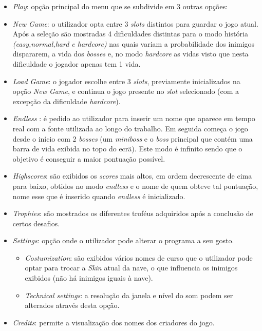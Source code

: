 \documentclass[a4paper,11pt]{article}
\begin{document}
\begin{itemize}
    \item \textit{Play}: opção principal do menu que se subdivide em 3 outras opções:
    \item \textit{New Game}: o utilizador opta entre 3 \textit{slots} distintos para guardar o jogo atual. Após a seleção são mostradas 4 dificuldades distintas para o modo história\textit{ (easy,normal,hard e hardcore)} nas quais variam a probabilidade dos inimigos dispararem, a vida dos \textit{bosses} e, no modo \textit{hardcore} as vidas visto que nesta dificuldade o jogador apenas tem 1 vida.

    \item \textit{Load Game}: o jogador escolhe entre 3 \textit{slots}, previamente inicializados na opção \textit{New Game}, e continua o jogo presente no \textit{slot} selecionado (com a excepção da dificuldade \textit{hardcore}).

    \item   \textit{Endless} : é pedido ao utilizador para inserir um nome que aparece em tempo real com a fonte utilizada ao longo do trabalho. Em seguida começa o jogo desde o início com 2 \textit{bosses} (um \textit{miniboss} e o \textit{boss} principal que contém uma barra de vida exibida no topo do ecrã). Este modo é infinito sendo que o objetivo é conseguir a maior pontuação possível.
    \item  \textit{Highscores}: são exibidos os \textit{scores }mais altos, em ordem decrescente de cima para baixo, obtidos no modo \textit{endless} e o nome de quem obteve tal pontuação, nome esse que é inserido quando \textit{endless} é inicializado.

    \item \textit{Trophies}: são mostrados os diferentes troféus adquiridos após a conclusão de certos desafios.
    \item \textit{Settings}: opção onde o utilizador pode alterar o programa a seu gosto.
          \begin{itemize}
              \item  \textit{Costumization}: são exibidos vários nomes de curso que o utilizador pode optar para trocar a \textit{Skin} atual da nave, o que influencia os inimigos exibidos (não há inimigos iguais à nave).
              \item  \textit{Technical settings}: a resolução da janela e nível do som podem ser alterados através desta opção.
          \end{itemize}
    \item \textit{Credits}: permite a visualização dos nomes dos criadores do jogo.
    

\end{itemize}
\end{document}
